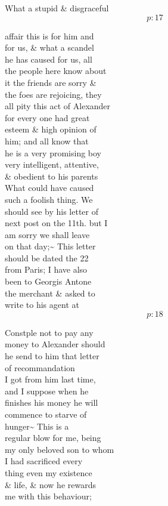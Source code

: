 \documentclass{report}
\begin{document}
	\par{
 	What a stupid \& disgraceful\ \\
  \[p: 17 \]

	}



	\par{
 	affair this is for him and\ \\for us, \& what a scandel\ \\he has caused for us, all\ \\the people here know about\ \\it the friends are sorry \&\ \\the foes are rejoicing, they\ \\all pity this act of Alexander\ \\for every one had great\ \\esteem \& high opinion of\ \\him; and all know that\ \\he is a very promising boy\ \\very intelligent, attentive,\ \\\& obedient to his parents\ \\What could have caused\ \\such a foolish thing. We\ \\should see by his letter of\ \\next post on the 11th. but I\ \\am sorry we shall leave\ \\on that day;\~{} This letter\ \\should be dated the 22\ \\from Paris; I have also\ \\been to Georgis Antone\ \\the merchant \& asked to\ \\write to his agent at\ \\
  \[p: 18 \]

	}

	\par{
 	Constple not to pay any\ \\money to Alexander should\ \\he send to him that letter\ \\of recommandation\ \\I got from him last time,\ \\and I suppose when he\ \\finishes his money he will\ \\commence to starve of\ \\hunger\~{} This is a\ \\regular blow for me, being\ \\my only beloved son to whom\ \\I had sacrificed every\ \\thing even my existence\ \\\& life, \& now he rewards\ \\me with this behaviour;\ \\
	}
\end{document}
